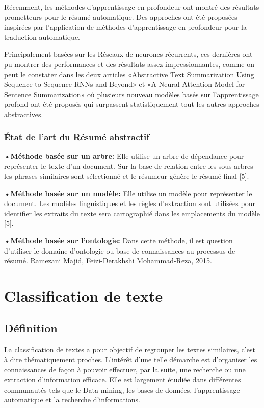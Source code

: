         Récemment, les méthodes d'apprentissage en profondeur ont montré des résultats prometteurs pour le résumé automatique. Des approches ont été proposées inspirées par l'application de méthodes d'apprentissage en profondeur pour la traduction automatique.

        Principalement basées sur les Réseaux de neurones récurrents, ces dernières ont pu montrer des performances et des résultats assez impressionnantes, comme on peut le constater dans les deux articles «Abstractive Text Summarization Using Sequence-to-Sequence RNNs and Beyond»\cite{atsuss} et «A Neural Attention Model for Sentence Summarization»\cite{ruch} où plusieurs nouveau modèles basés sur l'apprentissage profond ont été proposés qui surpassent statistiquement tout les autres approches abstractives.

        \subsubsection{État de l'art du Résumé abstractif}
        \textbf{•Méthode basée sur un arbre:} Elle utilise un arbre de dépendance pour représenter le texte d'un document. Sur la base de relation entre les sous-arbres les phrases similaires sont sélectionné et le résumeur génère le résumé final [5].
            
        \textbf{•Méthode basée sur un modèle:} Elle utilise un modèle pour représenter le document. Les modèles linguistiques et les règles d'extraction sont utilisées pour identifier les extraits du texte sera cartographié dans les emplacements du modèle [5].

        \textbf{•Méthode basée sur l'ontologie:} Dans cette méthode, il est question d'utiliser le domaine d'ontologie ou base de connaissances au processus de résumé.
            Ramezani Majid, Feizi-Derakhshi
            Mohammad-Reza, 2015.
 
        

\section{Classification de texte}
    \subsection{Définition}
    La classification de textes a pour objectif de regrouper les textes similaires, c'est à dire thématiquement proches. L'intérêt d'une telle démarche est d'organiser les connaissances de façon à pouvoir effectuer, par la suite, une recherche ou une extraction d'information efficace. Elle est largement étudiée dans différentes communautés tels que le Data mining, les bases de données, l'apprentissage automatique et la recherche d'informations.

